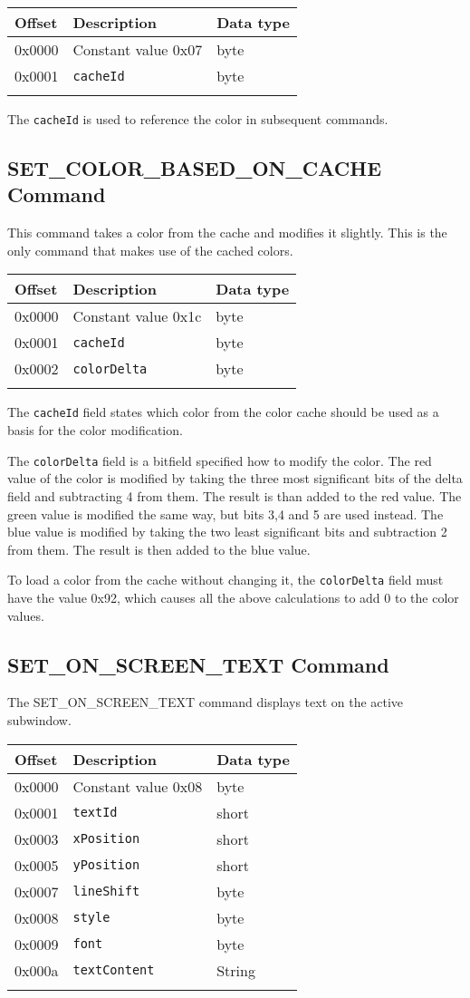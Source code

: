 \documentclass{article}
\newcommand{\field}[1]{\textcolor{fieldColor}{\texttt{#1}}}
\newenvironment{bytelisting}
{\ttfamily \begin{center} \begin{tabular}{l l l} Offset & Description & Data type \\ \hline}
{\normalfont \end{tabular} \end{center}}
\begin{document}
\begin{bytelisting}
0x0000 & Constant value 0x07 & byte \\
0x0001 & \field{cacheId} & byte \\
\end{bytelisting}

The \field{cacheId} is used to reference the color in subsequent commands.

\subsection{SET\_COLOR\_BASED\_ON\_CACHE Command}
This command takes a color from the cache and modifies it slightly. This is the only command that makes use of the cached colors.

\begin{bytelisting}
0x0000 & Constant value 0x1c & byte \\
0x0001 & \field{cacheId} & byte \\
0x0002 & \field{colorDelta} & byte \\
\end{bytelisting}

The \field{cacheId} field states which color from the color cache should be used as a basis for the color modification.

The \field{colorDelta} field is a bitfield specified how to modify the color. The red value of the color is modified by taking the three most significant bits of the delta field and subtracting 4 from them.
The result is than added to the red value. The green value is modified the same way, but bits 3,4 and 5 are used instead. The blue value is modified by taking the two least 
significant bits and subtraction 2 from them. The result is then added to the blue value.

To load a color from the cache without changing it, the \field{colorDelta} field must have the value 0x92, which causes all the above calculations to add 0 to the color values.

\subsection{SET\_ON\_SCREEN\_TEXT Command}
The SET\_ON\_SCREEN\_TEXT command displays text on the active subwindow.

\begin{bytelisting}
0x0000 & Constant value 0x08 & byte \\
0x0001 & \field{textId} & short \\
0x0003 & \field{xPosition} & short \\
0x0005 & \field{yPosition} & short \\
0x0007 & \field{lineShift} & byte \\
0x0008 & \field{style} & byte \\
0x0009 & \field{font} & byte \\
0x000a & \field{textContent} & String\\
\end{bytelisting}
\end{document}

